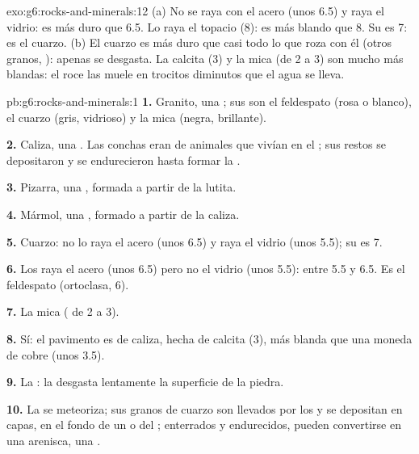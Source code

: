 \begin{solution}{exo:g6:rocks-and-minerals:12}
(a) No se raya con el acero (unos 6.5) y raya el vidrio: es más duro que
6.5. Lo raya el topacio (8): es más blando que 8. Su  es 7: es el
cuarzo. (b) El cuarzo es más duro que casi todo lo que roza con él (otros
granos, ): apenas se desgasta. La calcita (3) y la mica (de 2 a 3) son
mucho más blandas: el roce las muele en trocitos diminutos que el agua se
lleva.
\end{solution}

\begin{solution}{pb:g6:rocks-and-minerals:1}
\textbf{1.} Granito, una ; sus  son el feldespato (rosa
o blanco), el cuarzo (gris, vidrioso) y la mica (negra, brillante).

\textbf{2.} Caliza, una . Las conchas eran de animales que
vivían en el ; sus restos se depositaron y se endurecieron hasta formar
la .

\textbf{3.} Pizarra, una , formada a partir de la lutita.

\textbf{4.} Mármol, una , formado a partir de la caliza.

\textbf{5.} Cuarzo: no lo raya el acero (unos 6.5) y raya el vidrio (unos
5.5); su  es 7.

\textbf{6.} Los raya el acero (unos 6.5) pero no el vidrio (unos 5.5):
entre 5.5 y 6.5. Es el feldespato (ortoclasa, 6).

\textbf{7.} La mica ( de 2 a 3).

\textbf{8.} Sí: el pavimento es de caliza, hecha de calcita (3), más blanda
que una moneda de cobre (unos 3.5).

\textbf{9.} La : la  desgasta lentamente la superficie
de la piedra.

\textbf{10.} La  se meteoriza; sus granos de cuarzo son llevados por
los  y se depositan en capas, en el fondo de un  o del ;
enterrados y endurecidos, pueden convertirse en una arenisca, una .


\end{solution}
